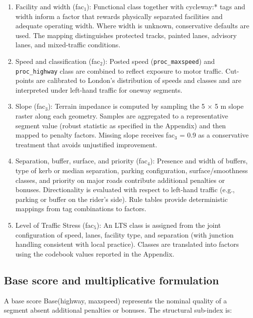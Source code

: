 \documentclass[
  12pt,
  oneside]{book}
\begin{document}
\begin{enumerate}
\def\labelenumi{\arabic{enumi}.}
\item
  Facility and width (fac\(_1\)): Functional class together with cycleway:* tags and width inform a factor that rewards physically separated facilities and adequate operating width. Where width is unknown, conservative defaults are used. The mapping distinguishes protected tracks, painted lanes, advisory lanes, and mixed-traffic conditions.
\item
  Speed and classification (fac\(_2\)): Posted speed (\texttt{proc\_maxspeed}) and \texttt{proc\_highway} class are combined to reflect exposure to motor traffic. Cut-points are calibrated to London's distribution of speeds and classes and are interpreted under left-hand traffic for oneway segments.
\item
  Slope (fac\(_3\)): Terrain impedance is computed by sampling the 5 × 5 m slope raster along each geometry. Samples are aggregated to a representative segment value (robust statistic as specified in the Appendix) and then mapped to penalty factors. Missing slope receives fac\(_3\) = 0.9 as a conservative treatment that avoids unjustified improvement.
\item
  Separation, buffer, surface, and priority (fac\(_4\)): Presence and width of buffers, type of kerb or median separation, parking configuration, surface/smoothness classes, and priority on major roads contribute additional penalties or bonuses. Directionality is evaluated with respect to left-hand traffic (e.g., parking or buffer on the rider's side). Rule tables provide deterministic mappings from tag combinations to factors.
\item
  Level of Traffic Stress (fac\(_5\)): An LTS class is assigned from the joint configuration of speed, lanes, facility type, and separation (with junction handling consistent with local practice). Classes are translated into factors using the codebook values reported in the Appendix.
\end{enumerate}

\subsection{Base score and multiplicative formulation}\label{base-score-and-multiplicative-formulation}

A base score Base(highway, maxspeed) represents the nominal quality of a segment absent additional penalties or bonuses. The structural sub-index is:
\end{document}
